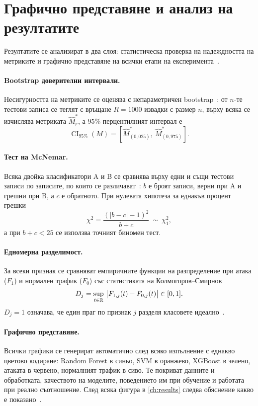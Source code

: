 \section{Графично представяне и анализ на резултатите}\label{sec:stats}

Резултатите се анализират в два слоя: статистическа проверка на надеждността на метриките и графично представяне на всички етапи на експеримента~\cite{efron1993}.

\paragraph{Bootstrap доверителни интервали.} Несигурността на метриките се оценява с непараметричен bootstrap~\cite{efron1993}: от $n$-те тестови записа се теглят с връщане $R=\num{1000}$ извадки с размер $n$, върху всяка се изчислява метриката $\hat M^{*}_r$, а 95\% перцентилният интервал е
\begin{equation}\label{eq:bootstrap}
\operatorname{CI}_{95\%}(M)=\left[\hat{M}^{*}_{(0{,}025)},\ \hat{M}^{*}_{(0{,}975)}\right].
\end{equation}

\paragraph{Тест на McNemar.} Всяка двойка класификатори A и B се сравнява върху едни и същи тестови записи по записите, по които се различават~\cite{mcnemar1947,dietterich1998}: $b$ е броят записи, верни при A и грешни при B, а $c$ е обратното. При нулевата хипотеза за еднакъв процент грешки
\begin{equation}\label{eq:mcnemar}
\chi^2=\frac{\left(|b-c|-1\right)^2}{b+c}\ \sim\ \chi^2_1,
\end{equation}
а при $b+c<25$ се използва точният биномен тест.

\paragraph{Едномерна разделимост.} За всеки признак се сравняват емпиричните функции на разпределение при атака ($F_1$) и нормален трафик ($F_0$) със статистиката на Колмогоров--Смирнов
\begin{equation}\label{eq:ks}
D_j=\sup_{t\in\mathbb{R}}\ \bigl|F_{1,j}(t)-F_{0,j}(t)\bigr|\in[0,1].
\end{equation}
$D_j=1$ означава, че един праг по признак $j$ разделя класовете идеално~\cite{hastie2009}.

\paragraph{Графично представяне.} Всички графики се генерират автоматично след всяко изпълнение с еднакво цветово кодиране: Random Forest в синьо, SVM в оранжево, XGBoost в зелено, атаката в червено, нормалният трафик в сиво. Те покриват данните и обработката, качеството на моделите, поведението им при обучение и работата при реално съотношение. След всяка фигура в \cref{ch:results} следва обяснение какво е показано~\cite{repo}.
